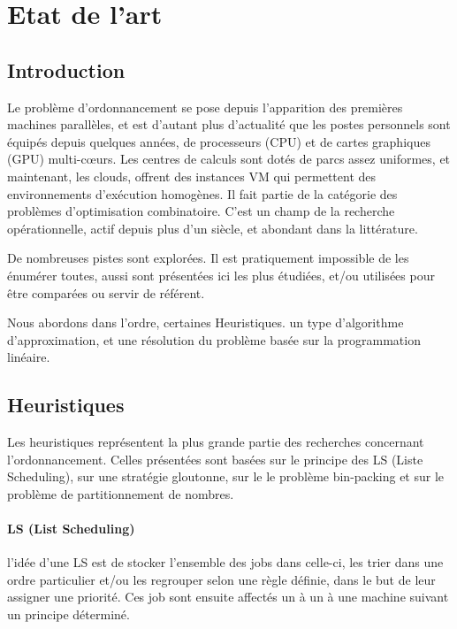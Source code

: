 \documentclass[a4paper,12pt]{report}
\theoremstyle{plain}				%
\theoremstyle{definition}				%
\begin{document}
\section{Etat de l'art} \label{sec:etatDeLArt}

\subsection{Introduction} \label{ssec:etatDeLArtIntroduction}

Le problème d'ordonnancement se pose depuis l'apparition des premières machines parallèles, et 
  est d'autant plus d'actualité que les postes personnels sont équipés depuis quelques années, 
  de processeurs (CPU) et de cartes graphiques (GPU) multi-c{\oe}urs.
Les centres de calculs sont dotés de parcs assez uniformes, et maintenant, 
  les clouds, offrent des instances VM qui permettent des environnements 
  d'exécution homogènes.     
Il fait partie de la catégorie des problèmes d'optimisation combinatoire. 
C'est un champ de la recherche opérationnelle, actif depuis plus d'un siècle, 
  et abondant dans la littérature. 

De nombreuses pistes sont explorées. Il est pratiquement impossible de les énumérer toutes, 
  aussi sont présentées ici les plus étudiées, 
  et/ou utilisées pour être comparées ou servir de référent.
  
Nous abordons dans l'ordre, certaines Heuristiques. un type d'algorithme d'approximation, et une résolution du problème basée sur la programmation linéaire.

\subsection{Heuristiques}\label{ssec:Heuristiques}

Les heuristiques représentent la plus grande partie des recherches concernant l'ordonnancement. 
Celles présentées sont basées 
  sur le principe des LS (Liste Scheduling), 
  sur une stratégie gloutonne,   
  sur le le problème bin-packing et  
  sur le problème de partitionnement de nombres. 

\bigskip   
\paragraph{LS (List Scheduling)}
l'idée d'une LS est de stocker l'ensemble des jobs dans celle-ci, les trier dans une ordre particulier et/ou les regrouper selon une règle définie, dans le but de leur assigner une priorité. Ces job sont ensuite affectés un à un à une machine suivant un principe déterminé.
\end{document}
